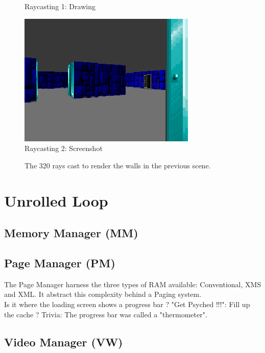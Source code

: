 \documentclass[book.tex]{subfiles}
\begin{document}
\begin{figure}[H]
  \centering
  
 \caption{Raycasting 1: Drawing} \label{fig:Raycasting1}
\end{figure}




\begin{figure}[H]
  \centering
 \includegraphics[scale=1.3]{imgs/ray_caster_explained/out_door.png}
 \caption{Raycasting 2: Screenshot} \label{fig:Raycasting2Drawing}
\end{figure}

\begin{figure}[H]
\centering
 
 \caption{The 320 rays cast to render the walls in the previous scene.} \label{fig:Raycasting2}
\end{figure}
 
 

\section{Unrolled Loop}
\subsection{Memory Manager (MM)}

\subsection{Page Manager (PM)}
The Page Manager harness the three types of RAM available: Conventional, XMS and XML. It abstract this complexity behind a Paging system.\\
Is it where the loading screen shows a progress bar ?
"Get Psyched !!!": Fill up the cache ?
Trivia: The progress bar was called a "thermometer".
\subsection{Video Manager (VW)}
\end{document}
